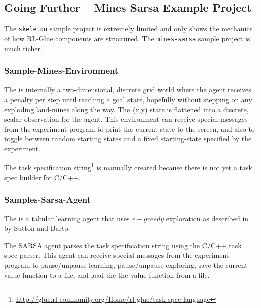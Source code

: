 \documentclass[11pt]{article}
\begin{document}
\subsection{Going Further -- Mines Sarsa Example Project}
\label{mines-sarsa-sample}
The \texttt{skeleton} sample project is extremely limited and only shows the mechanics of how RL-Glue components are structured.  The \texttt{mines-sarsa} sample project is much richer.

\subsubsection{Sample-Mines-Environment}
\label{mines-sample}
The 
is internally a two-dimensional, discrete grid world where the agent receives a penalty per step until reaching a goal state, hopefully without stepping on any exploding land-mines along the way.  The (x,y) state is flattened into a discrete, scalar observation for the agent.  This environment can receive special messages from the experiment program to print the current state to the screen, and also to toggle between random starting states and a fixed starting-state specified by the experiment.

The task specification string\footnote{\url{http://glue.rl-community.org/Home/rl-glue/task-spec-language}} is manually created because there is not yet a task spec builder for C/C++. 

\subsubsection{Samples-Sarsa-Agent}
\label{sarsa-sample}
The 
is a tabular learning agent that uses $\epsilon-greedy$ exploration as described in  by Sutton and Barto.

The SARSA agent parses the task specification string using the C/C++ task spec parser.  This agent can receive special messages from the experiment program to pause/unpause learning, pause/unpause exploring, save the current value function to a file, and load the the value function from a file.
\end{document}

